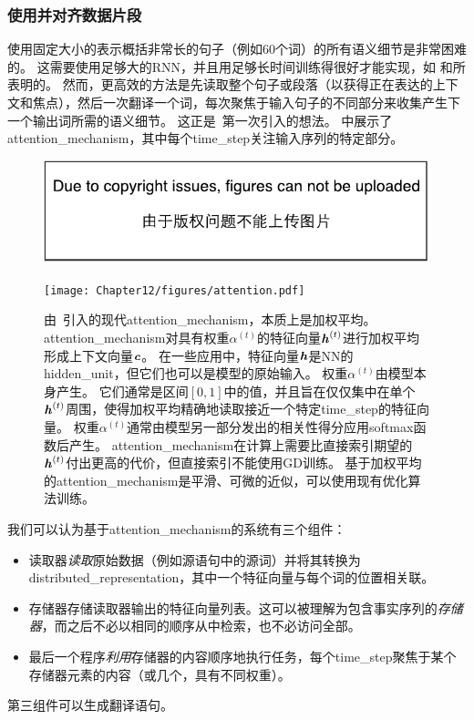 
\subsubsection{使用并对齐数据片段}
\label{sec:using_an_attention_mechanism_and_aligning_pieces_of_data}
使用固定大小的表示概括非常长的句子（例如60个词）的所有语义细节是非常困难的。 
这需要使用足够大的RNN，并且用足够长时间训练得很好才能实现，如 \citet{Cho-et-al-EMNLP2014}和\citet{Sutskever-et-al-NIPS2014}所表明的。
然而，更高效的方法是先读取整个句子或段落（以获得正在表达的上下文和焦点），然后一次翻译一个词，每次聚焦于输入句子的不同部分来收集产生下一个输出词所需的语义细节。
这正是~\citet{Bahdanau-et-al-ICLR2015-small}第一次引入的想法。
中展示了\gls{attention_mechanism}，其中每个\gls{time_step}关注输入序列的特定部分。

 \begin{figure}[htp]
\ifOpenSource
\centerline{\includegraphics{figure.pdf}}
\else
\centerline{\texttt{[image: Chapter12/figures/attention.pdf]}}
\fi
\caption{由~\citet{Bahdanau-et-al-ICLR2015-small}引入的现代\gls{attention_mechanism}，本质上是加权平均。
\gls{attention_mechanism}对具有权重$\alpha^{(t)}$的特征向量$\boldsymbol{\mathit{h}}^{(t)}$进行加权平均形成上下文向量$\boldsymbol{\mathit{c}}$。
在一些应用中，特征向量$\boldsymbol{\mathit{h}}$是\gls{NN}的\gls{hidden_unit}，但它们也可以是模型的原始输入。
权重$\alpha^{(t)}$由模型本身产生。
它们通常是区间$[0,1]$中的值，并且旨在仅仅集中在单个$\boldsymbol{\mathit{h}}^{(t)}$周围，使得加权平均精确地读取接近一个特定\gls{time_step}的特征向量。
权重$\alpha^{(t)}$通常由模型另一部分发出的相关性得分应用softmax函数后产生。
\gls{attention_mechanism}在计算上需要比直接索引期望的$\boldsymbol{\mathit{h}}^{(t)}$付出更高的代价，但直接索引不能使用\gls{GD}训练。
基于加权平均的\gls{attention_mechanism}是平滑、可微的近似，可以使用现有优化算法训练。
}
\label{fig:chap12_attention}
\end{figure}

我们可以认为基于\gls{attention_mechanism}的系统有三个组件：
\begin{itemize}
 \item   读取器\emph{读取}原始数据（例如源语句中的源词）并将其转换为\gls{distributed_representation}，其中一个特征向量与每个词的位置相关联。
 \item 存储器存储读取器输出的特征向量列表。这可以被理解为包含事实序列的\emph{存储器}，而之后不必以相同的顺序从中检索，也不必访问全部。
 \item 最后一个程序\emph{利用}存储器的内容顺序地执行任务，每个\gls{time_step}聚焦于某个存储器元素的内容（或几个，具有不同权重）。
\end{itemize}
第三组件可以生成翻译语句。

